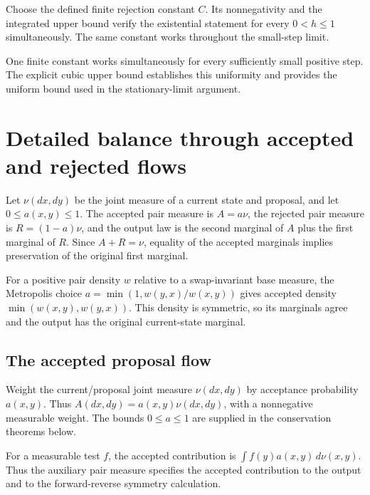 \documentclass[11pt,a4paper]{report}
\begin{document}
Choose the defined finite rejection constant \(C\). Its nonnegativity and the integrated upper bound verify the existential statement for every \(0<h\le1\) simultaneously. The same constant works throughout the small-step limit.



One finite constant works simultaneously for every sufficiently small positive step. The explicit cubic upper bound establishes this uniformity and provides the uniform bound used in the stationary-limit argument.

\section{\texorpdfstring{Detailed balance through accepted and rejected flows}{Detailed balance through accepted and rejected flows}}
\label{proof-module-UnadjustedLangevin-Metropolis-lean}


Let \(\nu(dx,dy)\) be the joint measure of a current state and proposal, and let \(0\le a(x,y)\le1\). The accepted pair measure is \(A=a\nu\), the rejected pair measure is \(R=(1-a)\nu\), and the output law is the second marginal of \(A\) plus the first marginal of \(R\). Since \(A+R=\nu\), equality of the accepted marginals implies preservation of the original first marginal.



For a positive pair density \(w\) relative to a swap-invariant base measure, the Metropolis choice \(a=\min(1,w(y,x)/w(x,y))\) gives accepted density \(\min(w(x,y),w(y,x))\). This density is symmetric, so its marginals agree and the output has the original current-state marginal.

\subsection{\texorpdfstring{The accepted proposal flow}{The accepted proposal flow}}
\label{report-step-UnadjustedLangevin-Metropolis-lean-1}


Weight the current/\allowbreak{}proposal joint measure \(\nu(dx,dy)\) by acceptance probability \(a(x,y)\). Thus \(A(dx,dy)=a(x,y)\nu(dx,dy)\), with a nonnegative measurable weight. The bounds \(0\le a\le1\) are supplied in the conservation theorems below.



For a measurable test \(f\), the accepted contribution is \(\int f(y)a(x,y)\,d\nu(x,y)\). Thus the auxiliary pair measure specifies the accepted contribution to the output and to the forward-reverse symmetry calculation.
\end{document}
